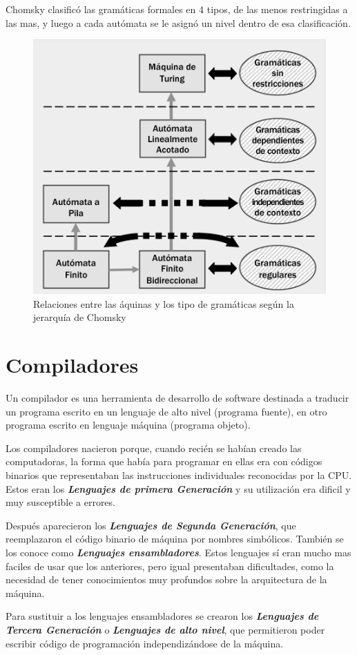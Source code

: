 \documentclass[12pt]{article}
\begin{document}
Chomsky clasificó las gramáticas formales en 4 tipos, de las menos restringidas a las mas, y luego a cada autómata se le asignó un nivel dentro de esa clasificación.
\begin{figure}[H]
	\centering
	\includegraphics[width=0.7\linewidth]{imagenes/jerarquia_gramatica_maquinas.png}
	\caption{Relaciones entre las áquinas y los tipo de gramáticas según la jerarquía de Chomsky}
	\label{fig:jerarquia_gramaticas}
\end{figure}

\section{Compiladores}
Un compilador es una herramienta de desarrollo de software destinada a traducir un programa escrito en un lenguaje de alto nivel (programa fuente), en otro programa escrito en lenguaje máquina (programa objeto).

Los compiladores nacieron porque, cuando recién se habían creado las computadoras, la forma que había para programar en ellas era con códigos binarios que representaban las instrucciones individuales reconocidas por la CPU. Estos eran los \textbf{\textit{Lenguajes de primera Generación}} y su utilización era dificil y muy susceptible a errores.

Después aparecieron los \textbf{\textit{Lenguajes de Segunda Generación}}, que reemplazaron el código binario de máquina por nombres simbólicos. También se los conoce como \textbf{\textit{Lenguajes ensambladores}}. Estos lenguajes sí eran mucho mas faciles de usar que los anteriores, pero igual presentaban dificultades, como la necesidad de tener conocimientos muy profundos sobre la arquitectura de la máquina.

Para sustituir a los lenguajes ensambladores se crearon los \textbf{\textit{Lenguajes de Tercera Generación}} o \textbf{\textit{Lenguajes de alto nivel}}, que permitieron poder escribir código de programación independizándose de la máquina.
\end{document}
